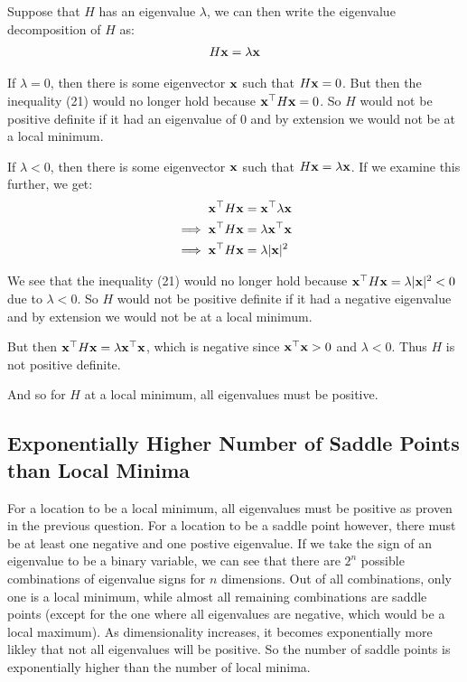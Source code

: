 \documentclass[a4paper]{article}
\begin{document}
Suppose that $H$ has an eigenvalue $\lambda$, we can then write the eigenvalue decomposition of $H$ as:
\begin{align}
   H\mathbf{x} = \lambda \mathbf{x}
\end{align}

If $\lambda=0$, then there is some eigenvector $\mathbf{x}$ such that $H\mathbf{x}=0$. But then the inequality (21) would no
longer hold because $\mathbf{x}^{\top} H \mathbf{x} = 0$. So $H$ would not be positive definite if it had an eigenvalue of 0
and by extension we would not be at a local minimum.

If $\lambda<0$, then there is some eigenvector $\mathbf{x}$ such that $H\mathbf{x}=\lambda \mathbf{x}$.
If we examine this further, we get:
\begin{align}
   \mathbf{x}^{\top} H \mathbf{x} &= \mathbf{x}^{\top} \lambda \mathbf{x} \\
   \implies \mathbf{x}^{\top} H \mathbf{x} &= \lambda \mathbf{x}^{\top} \mathbf{x} \\
   \implies \mathbf{x}^{\top} H \mathbf{x} &= \lambda |\mathbf{x}|^2
\end{align}

We see that the inequality (21) would no longer hold because $\mathbf{x}^{\top} H \mathbf{x} = \lambda |\mathbf{x}|^2 < 0$ due to
$\lambda<0$. So $H$ would not be positive definite if it had a negative eigenvalue and by extension we would not be at
a local minimum.

But then $\mathbf{x}^{\top} H \mathbf{x}=\lambda \mathbf{x}^{\top} \mathbf{x}$,
which is negative since $\mathbf{x}^{\top} \mathbf{x}>0$ and $\lambda<0$. Thus $H$ is not positive definite.

And so for $H$ at a local minimum, all eigenvalues must be positive.
\bigskip

\subsection{Exponentially Higher Number of Saddle Points than Local Minima}
For a location to be a local minimum, all eigenvalues must be positive as proven in the previous question. For a
location to be a saddle point however, there must be at least one negative and one postive eigenvalue.
If we take the sign of an eigenvalue to be a binary variable, we can see that there are $2^n$ possible combinations
of eigenvalue signs for $n$ dimensions. Out of all combinations, only one is a local minimum, while almost all
remaining combinations are saddle points (except for the one where all eigenvalues are negative, which would be a
local maximum). As dimensionality increases, it becomes exponentially more likley that not all eigenvalues will be
positive. So the number of saddle points is exponentially higher than the number of local minima.
\bigskip
\end{document}

